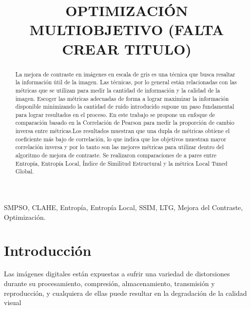 \documentclass[spanish,twocolumn]{article}
\title{OPTIMIZACIÓN MULTIOBJETIVO (FALTA CREAR TITULO) }
\begin{document}
%	
\maketitle
%
\begin{abstract}


La mejora de contraste en imágenes en escala de gris es una técnica que busca resaltar la información útil de la imagen. Las técnicas, por lo general están relacionadas con las métricas que se utilizan para medir la cantidad de información y la calidad de la imagen. Escoger las métricas adecuadas de forma a lograr maximizar la información disponible minimizando la cantidad de ruido introducido supone un paso fundamental para lograr resultados en el proceso. En este trabajo se propone un enfoque de comparación basado en la Correlación de Pearson para medir la proporción de cambio inversa entre métricas.Los resultados muestran que una dupla de métricas obtiene el coeficiente más bajo de correlación, lo que indica que los objetivos muestran mayor correlación inversa y por lo tanto son las mejores métricas para utilizar dentro del algoritmo de mejora de contraste. Se realizaron comparaciones de a pares entre Entropía, Entropía Local, Índice de Similitud Estructural y la métrica Local Tuned Global.


\end{abstract}
%
\begin{keywords}
SMPSO, CLAHE, Entropía, Entropía Local, SSIM, LTG, Mejora del Contraste, Optimización.
\end{keywords}
%
\section{Introducción}
\label{sec:intro}
Las imágenes digitales están expuestas a sufrir una variedad de distorsiones durante su procesamiento, compresión, almacenamiento, transmisión y reproducción, y cualquiera de ellas puede resultar en la degradación de la calidad visual %
\end{document}
